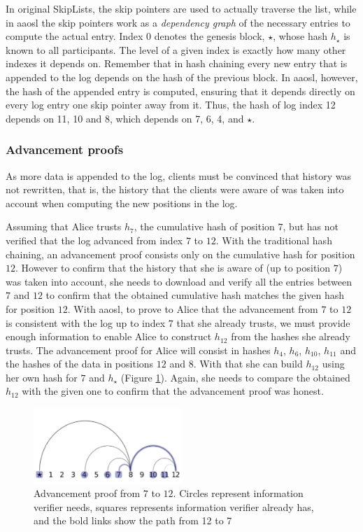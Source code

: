 In original SkipLists, the skip pointers are used to actually traverse the list, while in \gls{aaosl} the skip pointers work as a \textit{dependency graph} of the necessary entries to compute the actual entry. 
Index $0$ denotes the genesis block, $\star$, whose hash $h_\star $ is known to all participants. The level of a given index is exactly how many other indexes it depends on. 
Remember that in hash chaining every new entry that is appended to the log depends on the hash of the previous block. In \gls{aaosl}, however, the hash of the appended entry is computed, ensuring that it depends directly on every log entry one skip pointer away from it. Thus, the hash of log index 12 depends on 11, 10 and 8, which depends on 7, 6, 4, and $\star$.

\subsubsection{Advancement proofs}
As more data is appended to the log, clients must be convinced that history was not rewritten, that is, the history that the clients were aware of was taken into account when computing the new positions in the log. 

Assuming that Alice trusts $h_7$, the cumulative hash of position $7$, but has not verified that the log advanced from index $7$ to $12$. With the traditional hash chaining, an advancement proof consists only on the cumulative hash for position $12$. However to confirm that the history that she is aware of (up to position $7$) was taken into account, she needs to download and verify all the entries between $7$ and $12$ to confirm that the obtained cumulative hash matches the given hash for position $12$. With \gls{aaosl}, to prove to Alice that the advancement from $7$ to $12$ is consistent with the log up to index $7$ that she already trusts, we must provide enough information to enable Alice to construct $h_{12}$ from the hashes she already trusts. The advancement proof for Alice will consist in hashes $h_4$, $h_6$, $h_10$, $h_11$ and the hashes of the data in positions $12$ and $8$. With that she can build $h_12$ using her own hash for $7$ and $h_\star$ (Figure \ref{fig:deps}). Again, she needs to compare the obtained $h_12$ with the given one to confirm that the advancement proof was honest.

\begin{figure}[h]
    \centering
    \includegraphics[width=0.5\textwidth]{img/skiplist2.png}
    \caption{Advancement proof from $7$ to $12$.
    Circles represent information verifier needs, squares represents information verifier already has, and the bold links show the path from 12 to 7}
    \label{fig:deps}
\end{figure}

